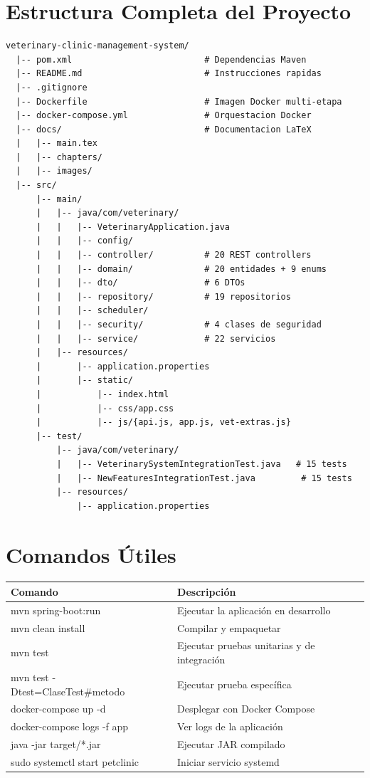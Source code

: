 \section{Estructura Completa del Proyecto}

\begin{verbatim}
veterinary-clinic-management-system/
  |-- pom.xml                          # Dependencias Maven
  |-- README.md                        # Instrucciones rapidas
  |-- .gitignore
  |-- Dockerfile                       # Imagen Docker multi-etapa
  |-- docker-compose.yml               # Orquestacion Docker
  |-- docs/                            # Documentacion LaTeX
  |   |-- main.tex
  |   |-- chapters/
  |   |-- images/
  |-- src/
      |-- main/
      |   |-- java/com/veterinary/
      |   |   |-- VeterinaryApplication.java
      |   |   |-- config/
      |   |   |-- controller/          # 20 REST controllers
      |   |   |-- domain/              # 20 entidades + 9 enums
      |   |   |-- dto/                 # 6 DTOs
      |   |   |-- repository/          # 19 repositorios
      |   |   |-- scheduler/
      |   |   |-- security/            # 4 clases de seguridad
      |   |   |-- service/             # 22 servicios
      |   |-- resources/
      |       |-- application.properties
      |       |-- static/
      |           |-- index.html
      |           |-- css/app.css
      |           |-- js/{api.js, app.js, vet-extras.js}
      |-- test/
          |-- java/com/veterinary/
          |   |-- VeterinarySystemIntegrationTest.java   # 15 tests
          |   |-- NewFeaturesIntegrationTest.java         # 15 tests
          |-- resources/
              |-- application.properties
\end{verbatim}

\section{Comandos \'Utiles}

\begin{longtable}{|p{6cm}|p{8cm}|}
\hline
\textbf{Comando} & \textbf{Descripci\'on} \\
\hline
mvn spring-boot:run & Ejecutar la aplicaci\'on en desarrollo \\
mvn clean install & Compilar y empaquetar \\
mvn test & Ejecutar pruebas unitarias y de integraci\'on \\
mvn test -Dtest=ClaseTest\#metodo & Ejecutar prueba espec\'ifica \\
docker-compose up -d & Desplegar con Docker Compose \\
docker-compose logs -f app & Ver logs de la aplicaci\'on \\
java -jar target/*.jar & Ejecutar JAR compilado \\
sudo systemctl start petclinic & Iniciar servicio systemd \\
\hline
\end{longtable}


